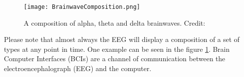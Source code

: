 
\begin{figure}
  \centering
  \texttt{[image: BrainwaveComposition.png]}
  \caption{A composition of alpha, theta and delta brainwaves. Credit: \cite{gall1992method}}
    \label{fig:brainwaveComposition}        
\end{figure}

\vspace{5mm}

Please note that almost always the EEG will display a composition of a set of types at any point in time. One example can be seen in the figure \ref{fig:brainwaveComposition}. Brain Computer Interfaces (BCIs) are a channel of communication between the electroencephalograph (EEG) and the computer.

